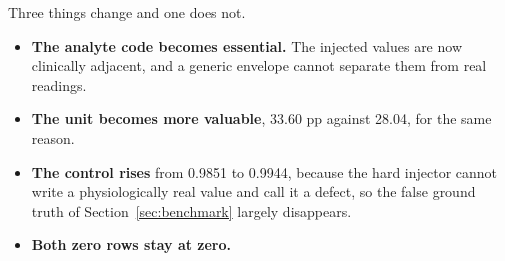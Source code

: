 Three things change and one does not.

\begin{itemize}[leftmargin=1.4em, itemsep=0.15em]
  \item \textbf{The analyte code becomes essential.} The injected values are now clinically adjacent,
        and a generic envelope cannot separate them from real readings.
  \item \textbf{The unit becomes more valuable}, 33.60 pp against 28.04, for the same reason.
  \item \textbf{The control rises} from 0.9851 to 0.9944, because the hard injector cannot write a
        physiologically real value and call it a defect, so the false ground truth of
        Section~\ref{sec:benchmark} largely disappears.
  \item \textbf{Both zero rows stay at zero.}
\end{itemize}

\FloatBarrier

